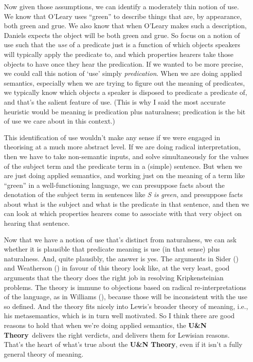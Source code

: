 \documentclass[
  11pt,
  letterpaper,
  DIV=11,
  numbers=noendperiod,
  twoside]{scrartcl}
\begin{document}
Now given those assumptions, we can identify a moderately thin notion of
use. We know that O'Leary uses ``green'' to describe things that are, by
appearance, both green and grue. We also know that when O'Leary makes
such a description, Daniels expects the object will be both green and
grue. So focus on a notion of use such that the \emph{use} of a
predicate just is a function of which objects speakers will typically
apply the predicate to, and which properties hearers take those objects
to have once they hear the predication. If we wanted to be more precise,
we could call this notion of `use' simply \emph{predication}. When we
are doing applied semantics, especially when we are trying to figure out
the meaning of predicates, we typically know which objects a speaker is
disposed to predicate a predicate of, and that's the salient feature of
use. (This is why I said the most accurate heuristic would be meaning is
predication plus naturalness; predication is the bit of use we care
about in this context.)

This identification of use wouldn't make any sense if we were engaged in
theorising at a much more abstract level. If we are doing radical
interpretation, then we have to take non-semantic inputs, and solve
simultaneously for the values of the subject term and the predicate term
in a (simple) sentence. But when we are just doing applied semantics,
and working just on the meaning of a term like ``green'' in a
well-functioning language, we can presuppose facts about the denotation
of the subject term in sentences like \emph{S is green}, and presuppose
facts about what is the subject and what is the predicate in that
sentence, and then we can look at which properties hearers come to
associate with that very object on hearing that sentence.

Now that we have a notion of use that's distinct from naturalness, we
can ask whether it is plausible that predicate meaning is use (in that
sense) plus naturalness. And, quite plausibly, the answer is yes. The
arguments in Sider () and
Weatherson () in favour of
this theory look like, at the very least, good arguments that the theory
does the right job in resolving Kripkensteinian problems. The theory is
immune to objections based on radical re-interpretations of the
language, as in Williams (), because
those will be inconsistent with the use so defined. And the theory fits
nicely into Lewis's broader theory of meaning, i.e., his metasemantics,
which is in turn well motivated. So I think there are good reasons to
hold that when we're doing applied semantics, the \textbf{U\&N
Theory}~delivers the right verdicts, and delivers them for Lewisian
reasons. That's the heart of what's true about the \textbf{U\&N Theory},
even if it isn't a fully general theory of meaning.
\end{document}
